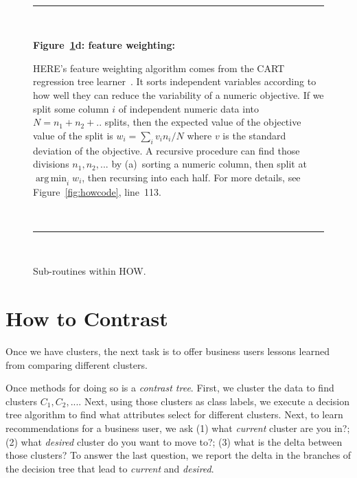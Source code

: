 \documentclass[conference]{IEEEtran}
\newcommand{\fig}[1]{Figure~\ref{fig:#1}}
\DeclareMathOperator*{\argmin}{arg\,min}
\begin{document}
\begin{figure}[t]
    ~\hrule~
    
    {\bf \fig{where}d: feature weighting:}
    
    HERE's feature weighting algorithm
    comes from the CART regression tree learner~\cite{Breiman1984}.
    It sorts independent variables
    according to how well they can reduce the variability
    of a  numeric objective.
    If we split some column $i$ of independent numeric data  into $N=n_1 + n_2 + ..$ splits,
    then the expected
    value of the objective value of the split  is $w_i = \sum_i v_in_i/N$
    where $v$ is the standard deviation of the objective.
    A recursive procedure can  find those divisions $n_1,n_2,...$ by (a)~sorting a numeric column,
    then split at $\argmin_i w_i$, then recursing into each half.  For more details, see  \fig{howcode}, line~113.
    
    ~\hrule~
    
    \caption{Sub-routines within HOW.}\label{fig:where}
\end{figure}

\section{How to Contrast}
Once we have  clusters, the next task is to offer business users lessons learned from comparing different clusters.

Once methods for doing so is a {\em contrast tree}.
First, we cluster the data to find clusters $C_1,C_2,...$.
Next, using those clusters as class labels, we execute a decision tree algorithm to find what attributes select for different clusters. Next, to learn recommendations for a business user, we ask (1) what {\em current} cluster are you in?; (2) what {\em desired} cluster do you want to move to?; (3) what is the delta between those clusters? To answer the last question, we report the delta in the branches of the decision tree that lead to {\em current} and {\em desired}. 

\end{document}
